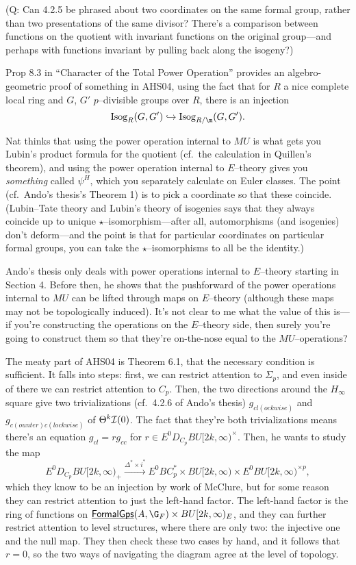 (Q: Can 4.2.5 be phrased about two coordinates on the same formal group, rather than two presentations of the same divisor?  There's a comparison between functions on the quotient with invariant functions on the original group---and perhaps with functions invariant by pulling back along the isogeny?)

Prop 8.3 in ``Character of the Total Power Operation'' provides an algebro-geometric proof of something in AHS04, using the fact that for $R$ a nice complete local ring and $G$, $G'$ $p$--divisible groups over $R$, there is an injection \[\Isog_R(G, G') \into \Isog_{R/\m}(G, G').\]

Nat thinks that using the power operation internal to $MU$ is what gets you Lubin's product formula for the quotient (cf.\ the calculation in Quillen's theorem), and using the power operation internal to $E$--theory gives you \emph{something} called $\psi^H$, which you separately calculate on Euler classes.  The point (cf.\ Ando's thesis's Theorem 1) is to pick a coordinate so that these coincide.  (Lubin--Tate theory and Lubin's theory of isogenies says that they always coincide up to unique $\star$--isomorphism---after all, automorphisms (and isogenies) don't deform---and the point is that for particular coordinates on particular formal groups, you can take the $\star$--isomorphisms to all be the identity.)

Ando's thesis only deals with power operations internal to $E$--theory starting in Section 4.  Before then, he shows that the pushforward of the power operations internal to $MU$ can be lifted through maps on $E$--theory (although these maps may not be topologically induced).  It's not clear to me what the value of this is---if you're constructing the operations on the $E$--theory side, then surely you're going to construct them so that they're on-the-nose equal to the $MU$--operations?

The meaty part of AHS04 is Theorem 6.1, that the necessary condition is sufficient.  It falls into steps: first, we can restrict attention to $\Sigma_p$, and even inside of there we can restrict attention to $C_p$.  Then, the two directions around the $H_\infty$ square give two trivializations (cf.\ 4.2.6 of Ando's thesis) $g_{cl(ockwise)}$ and $g_{c(ounter)c(lockwise)}$ of $\Theta^k \mathcal{I}(0)$.  The fact that they're both trivializations means there's an equation $g_{cl} = r g_{cc}$ for $r \in E^0 D_{C_p} BU[2k, \infty)^\times$.  Then, he wants to study the map \[E^0 D_{C_p} BU[2k, \infty)_+ \xrightarrow{\Delta^* \times i^*} E^0 BC_p^* \times BU[2k, \infty) \times E^0 BU[2k, \infty)^{\times p},\] which they know to be an injection by work of McClure, but for some reason they can restrict attention to just the left-hand factor.  The left-hand factor is the ring of functions on $\InternalHom{FormalGps}(A, \G_F) \times BU[2k, \infty)_E$, and they can further restrict attention to level structures, where there are only two: the injective one and the null map.  They then check these two cases by hand, and it follows that $r = 0$, so the two ways of navigating the diagram agree at the level of topology.

